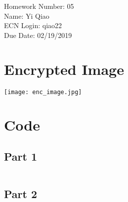 \documentclass[11pt]{article}
\begin{document}
\noindent Homework Number: 05\\
Name: Yi Qiao\\
ECN Login: qiao22\\
Due Date: 02/19/2019\\

\section*{Encrypted Image}

\texttt{[image: enc\_image.jpg]}

\section*{Code}
\subsection*{Part 1}
\inputminted[breaklines]{python}{x931.py}

\subsection*{Part 2}
\inputminted[breaklines]{python}{AES_image.py}
\end{document}
